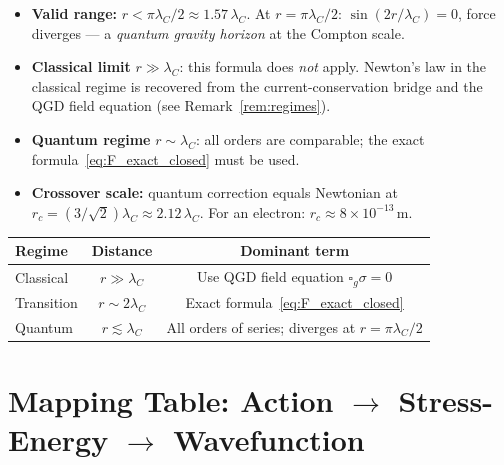 \documentclass[11pt,a4paper]{article}
\theoremstyle{definition}
\theoremstyle{remark}
\begin{document}
	\begin{itemize}
		\item \textbf{Valid range:} $r < \pi\lambda_C/2 \approx 1.57\,\lambda_C$.
		  At $r = \pi\lambda_C/2$: $\sin(2r/\lambda_C) = 0$, force diverges ---
		  a \emph{quantum gravity horizon} at the Compton scale.
		\item \textbf{Classical limit} $r\gg\lambda_C$: this formula does \emph{not}
		  apply.  Newton's law in the classical regime is recovered from the
		  current-conservation bridge and the QGD field equation (see
		  Remark~\ref{rem:regimes}).
		\item \textbf{Quantum regime} $r\sim\lambda_C$: all orders are comparable;
		  the exact formula~\eqref{eq:F_exact_closed} must be used.
		\item \textbf{Crossover scale:} quantum correction equals Newtonian
		  at $r_c = (3/\sqrt{2})\lambda_C \approx 2.12\,\lambda_C$. For an
		  electron: $r_c \approx 8\times10^{-13}$\,m.
	\end{itemize}

	\begin{table}[h]
		\centering
		\begin{tabular}{@{}lcc@{}}
			\toprule
			Regime & Distance & Dominant term \\
			\midrule
			Classical   & $r\gg\lambda_C$ & Use QGD field equation $\square_g\sigma=0$ \\
			Transition  & $r\sim2\lambda_C$ & Exact formula~\eqref{eq:F_exact_closed} \\
			Quantum     & $r\lesssim\lambda_C$ & All orders of series; diverges at $r=\pi\lambda_C/2$ \\
			\bottomrule
		\end{tabular}
	\end{table}
	
	\section{Mapping Table: Action $\to$ Stress-Energy $\to$ Wavefunction}
	
\end{document}
